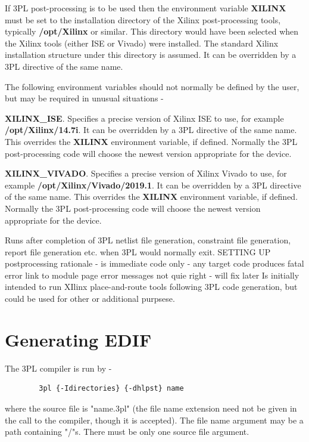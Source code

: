         If 3PL post-processing is to be used then the environment variable
        {\bf XILINX} must be set to the installation directory of the Xilinx
        post-processing tools, typically {\bf /opt/Xilinx} or similar. This
        directory would have been selected when the Xilinx tools (either ISE
        or Vivado) were installed. The standard Xilinx installation structure
        under this directory is assumed. It can be overridden by a 3PL
        directive of the same name.

        The following environment variables should not normally be defined by
        the user, but may be required in unusual situations -

        {\bf XILINX\_ISE}. Specifies a precise version of Xilinx ISE to use,
        for example  {\bf /opt/Xilinx/14.7i}. It can be overridden by a 3PL
        directive of the same name. This overrides the {\bf XILINX}
        environment variable, if defined. Normally the 3PL post-processing
        code will choose the newest version appropriate for the device.

        {\bf XILINX\_VIVADO}. Specifies a precise version of Xilinx Vivado to
        use, for example  {\bf /opt/Xilinx/Vivado/2019.1}. It can be
        overridden by a 3PL directive of the same name. This overrides the
        {\bf XILINX} environment variable, if defined. Normally the 3PL
        post-processing code will choose the newest version appropriate for
        the device.

        Runs after completion of 3PL netlist file generation, constraint file
        generation, report file generation etc. when 3PL would normally exit.
        SETTING UP postprocessing
        rationale - is immediate code only - any target code produces fatal error
        link to  module page
        error messages not quie right - will fix later
        Is initially intended to run XIlinx place-and-route tools following
        3PL code generation, but could be used for other or additional purpsese.







    \section{Generating EDIF}
    
        The 3PL compiler is run by -
        \begin{verbatim}
        3pl {-Idirectories} {-dhlpst} name
        \end{verbatim}
        where the source file is "name.3pl" (the file name extension need not
        be given in the call to the compiler, though it is accepted). The
        file name argument may be a path containing "/"s.
        There must be only one source file argument.

